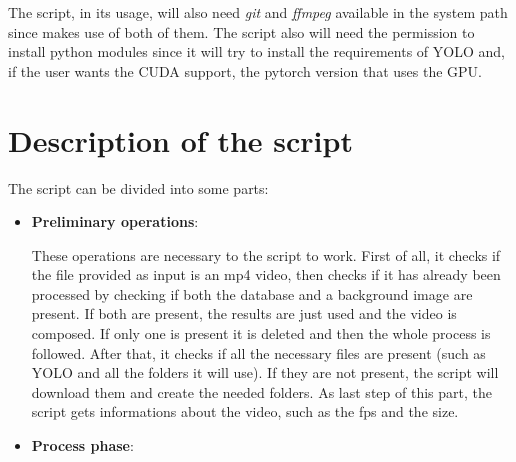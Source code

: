 \documentclass[conference]{IEEEtran}
\begin{document}
		The script, in its usage, will also need \textit{git} and \textit{ffmpeg} available in the system path since makes use of both of them.
		The script also will need the permission to install python modules since it will try to install the requirements of YOLO and, if the 
		user wants the CUDA support, the pytorch version that uses the GPU. 


	\section{Description of the script}
	
		The script can be divided into some parts:
		
		\begin{itemize}
			
			\item \textbf{Preliminary operations}:
				
				These operations are necessary to the script to work. First of all, it checks if the file provided as input 
				is an mp4 video, then checks if it has already been processed by checking if both the database and a background image are 
				present. If both are present, the results are just used and the video is composed. If only one is present it is 
				deleted and then the whole process is followed.
				After that, it checks if all the necessary files are present (such as YOLO and all the folders it will use). If 
				they are not present, the script will download them and create the needed folders.
				As last step of this part, the script gets informations about the video, such as the fps and the size.
			
			\item \textbf{Process phase\label{sec:dpp}}:
			

\end{itemize}
\end{document}
